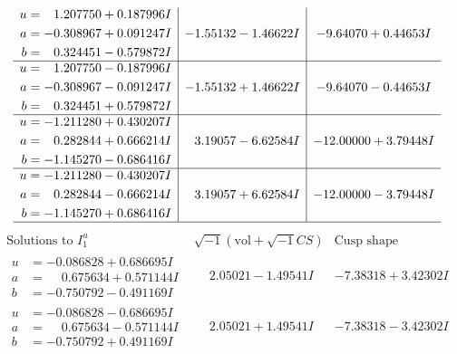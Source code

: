 \documentclass[1p]{elsarticle_modified}
\theoremstyle{definition}
\newcommand{\I}{\sqrt{-1}}
\begin{document}
$$\begin{array}{c|c|c}
\begin{aligned}
u &= \phantom{-}1.207750 + 0.187996 I \\
a &= -0.308967 + 0.091247 I \\
b &= \phantom{-}0.324451 - 0.579872 I\end{aligned}
 & -1.55132 - 1.46622 I & -9.64070 + 0.44653 I \\ \hline\begin{aligned}
u &= \phantom{-}1.207750 - 0.187996 I \\
a &= -0.308967 - 0.091247 I \\
b &= \phantom{-}0.324451 + 0.579872 I\end{aligned}
 & -1.55132 + 1.46622 I & -9.64070 - 0.44653 I \\ \hline\begin{aligned}
u &= -1.211280 + 0.430207 I \\
a &= \phantom{-}0.282844 + 0.666214 I \\
b &= -1.145270 - 0.686416 I\end{aligned}
 & \phantom{-}3.19057 - 6.62584 I & -12.00000 + 3.79448 I \\ \hline\begin{aligned}
u &= -1.211280 - 0.430207 I \\
a &= \phantom{-}0.282844 - 0.666214 I \\
b &= -1.145270 + 0.686416 I\end{aligned}
 & \phantom{-}3.19057 + 6.62584 I & -12.00000 - 3.79448 I\\
 \hline 
 \end{array}$$\newpage$$\begin{array}{c|c|c}  
\text{Solutions to }I^u_{1}& \I (\text{vol} + \sqrt{-1}CS) & \text{Cusp shape}\\
 \hline 
\begin{aligned}
u &= -0.086828 + 0.686695 I \\
a &= \phantom{-}0.675634 + 0.571144 I \\
b &= -0.750792 - 0.491169 I\end{aligned}
 & \phantom{-}2.05021 - 1.49541 I & -7.38318 + 3.42302 I \\ \hline\begin{aligned}
u &= -0.086828 - 0.686695 I \\
a &= \phantom{-}0.675634 - 0.571144 I \\
b &= -0.750792 + 0.491169 I\end{aligned}
 & \phantom{-}2.05021 + 1.49541 I & -7.38318 - 3.42302 I \\ \hline\begin{aligned}

\end{aligned}
\end{array}$$
\end{document}
